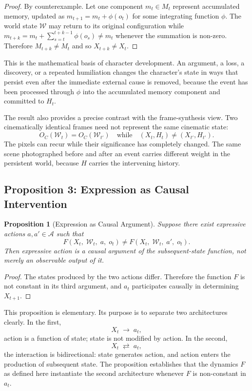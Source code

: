 \documentclass[11pt,a4paper]{article}
\theoremstyle{plain}
\newtheorem{proposition}[theorem]{Proposition}
\theoremstyle{definition}
\theoremstyle{remark}
\begin{document}
\begin{proof}
By counterexample. Let one component $m_t \in M_t$ represent accumulated memory, updated as $m_{t+1} = m_t + \phi(o_t)$ for some integrating function $\phi$. The world state $\mathcal{W}$ may return to its original configuration while $m_{t+k} = m_t + \sum_{s=t}^{t+k-1} \phi(o_s) \neq m_t$ whenever the summation is non-zero. Therefore $M_{t+k} \neq M_t$ and so $X_{t+k} \neq X_t$.
\end{proof}

This is the mathematical basis of character development. An argument, a loss, a discovery, or a repeated humiliation changes the character's state in ways that persist even after the immediate external cause is removed, because the event has been processed through $\phi$ into the accumulated memory component and committed to $H_t$.

The result also provides a precise contrast with the frame-synthesis view. Two cinematically identical frames need not represent the same cinematic state:
\[
O_C(\mathcal{W}_t) = O_C(\mathcal{W}_{t'})
\quad\text{while}\quad
(X_t, H_t) \neq (X_{t'}, H_{t'}).
\]
The pixels can recur while their significance has completely changed. The same scene photographed before and after an event carries different weight in the persistent world, because $H$ carries the intervening history.

\subsection{Proposition 3: Expression as Causal Intervention}

\begin{proposition}[Expression as Causal Argument]
\label{prop:causal}
Suppose there exist expressive actions $a, a' \in \mathcal{A}$ such that
\[
F(X_t,\; \mathcal{W}_t,\; a,\; o_t) \neq F(X_t,\; \mathcal{W}_t,\; a',\; o_t).
\]
Then expressive action is a causal argument of the subsequent-state function, not merely an observable output of it.
\end{proposition}

\begin{proof}
The states produced by the two actions differ. Therefore the function $F$ is not constant in its third argument, and $a_t$ participates causally in determining $X_{t+1}$.
\end{proof}

This proposition is elementary. Its purpose is to separate two architectures clearly. In the first,
\[
X_t \;\to\; a_t,
\]
action is a function of state; state is not modified by action. In the second,
\[
X_t \;\rightleftarrows\; a_t,
\]
the interaction is bidirectional: state generates action, and action enters the production of subsequent state. The proposition establishes that the dynamics $F$ as defined here instantiate the second architecture whenever $F$ is non-constant in $a_t$.
\end{document}
